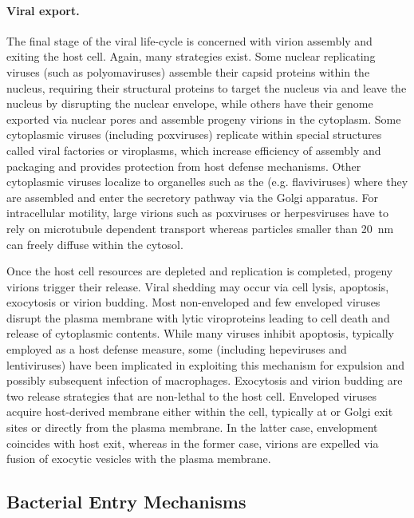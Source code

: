 \paragraph{Viral export.}
The final stage of the viral life-cycle is concerned with virion assembly and exiting the host cell. Again, many strategies exist. Some nuclear replicating viruses (such as polyomaviruses) assemble their capsid proteins within the nucleus, requiring their structural proteins to target the nucleus via  and leave the nucleus by disrupting the nuclear envelope, while others have their genome exported via nuclear pores and assemble progeny virions in the cytoplasm. Some cytoplasmic viruses (including poxviruses) replicate within special structures called viral factories or viroplasms, which increase efficiency of assembly and packaging and provides protection from host defense mechanisms. Other cytoplasmic viruses localize to organelles such as the  (e.g. flaviviruses) where they are assembled and enter the secretory pathway via the Golgi apparatus. For intracellular motility, large virions such as poxviruses or herpesviruses have to rely on microtubule dependent transport whereas particles smaller than \SI{20}{\nano\meter} can freely diffuse within the cytosol.

Once the host cell resources are depleted and replication is completed, progeny virions trigger their release. Viral shedding may occur via cell lysis, apoptosis, exocytosis or virion budding. Most non-enveloped and few enveloped viruses disrupt the plasma membrane with lytic viroproteins leading to cell death and release of cytoplasmic contents. While many viruses inhibit  apoptosis, typically employed as a host defense measure, some (including hepeviruses and lentiviruses) have been implicated in exploiting this mechanism for expulsion and possibly subsequent infection of macrophages. Exocytosis and virion budding are two release strategies that are non-lethal to the host cell. Enveloped viruses acquire host-derived membrane either within the cell, typically at  or Golgi exit sites or directly from the plasma membrane. In the latter case, envelopment coincides with host exit, whereas in the former case, virions are expelled via fusion of exocytic vesicles with the plasma membrane.

\subsection{Bacterial Entry Mechanisms}


